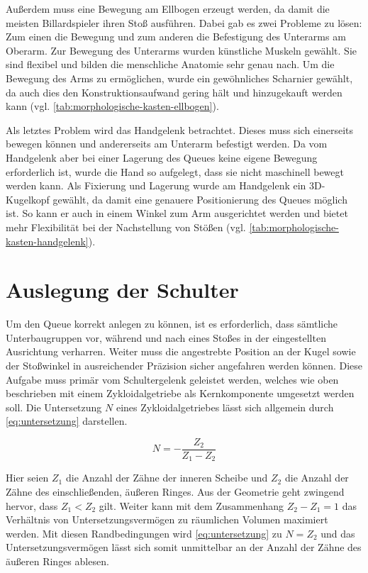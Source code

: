 		Außerdem muss eine Bewegung am Ellbogen erzeugt werden, da damit die meisten Billardspieler ihren Stoß ausführen. Dabei gab es zwei Probleme zu lösen: Zum einen die Bewegung und zum anderen die Befestigung des Unterarms am Oberarm. Zur Bewegung des Unterarms wurden künstliche Muskeln gewählt. Sie sind flexibel und bilden die menschliche Anatomie sehr genau nach. Um die Bewegung des Arms zu ermöglichen, wurde ein gewöhnliches Scharnier gewählt, da auch dies den Konstruktionsaufwand gering hält und hinzugekauft werden kann (vgl. \cref{tab:morphologische-kasten-ellbogen}).\par\medskip

		Als letztes Problem wird das Handgelenk betrachtet. Dieses muss sich einerseits bewegen können und andererseits am Unterarm befestigt werden. Da vom Handgelenk aber bei einer Lagerung des Queues keine eigene Bewegung erforderlich ist, wurde die Hand so aufgelegt, dass sie nicht maschinell bewegt werden kann. Als Fixierung und Lagerung wurde am Handgelenk ein 3D-Kugelkopf gewählt, da damit eine genauere Positionierung des Queues möglich ist. So kann er auch in einem Winkel zum Arm ausgerichtet werden und bietet mehr Flexibilität bei der Nachstellung von Stößen (vgl. \cref{tab:morphologische-kasten-handgelenk}).
	\section{Auslegung der Schulter}\label{sec:auslegung}

	Um den Queue korrekt anlegen zu können, ist es erforderlich, dass sämtliche Unterbaugruppen vor, während und nach eines Stoßes in der eingestellten Ausrichtung verharren.
	Weiter muss die angestrebte Position an der Kugel sowie der Stoßwinkel in ausreichender Präzision sicher angefahren werden können.
	Diese Aufgabe muss primär vom Schultergelenk geleistet werden, welches wie oben beschrieben mit einem Zykloidalgetriebe \cite{Lee.2020} \cite{Jang.2021} als Kernkomponente umgesetzt werden soll.
	Die Untersetzung \(N\) eines Zykloidalgetriebes lässt sich allgemein durch \cref{eq:untersetzung} darstellen.

	\begin{equation}
		N = -\frac{Z_2}{Z_1 - Z_2}%
		\label{eq:untersetzung}
	\end{equation}

	Hier seien \(Z_1\) die Anzahl der Zähne der inneren Scheibe und \(Z_2\) die Anzahl der Zähne des einschließenden, äußeren Ringes.
	Aus der Geometrie geht zwingend hervor, dass \(Z_1 < Z_2\) gilt.
	Weiter kann mit dem Zusammenhang \(Z_2 - Z_1 = 1\) das Verhältnis von Untersetzungsvermögen zu räumlichen Volumen maximiert werden.
	Mit diesen Randbedingungen wird \cref{eq:untersetzung} zu \(N = Z_2\) und das Untersetzungsvermögen lässt sich somit unmittelbar an der Anzahl der Zähne des äußeren Ringes ablesen.

